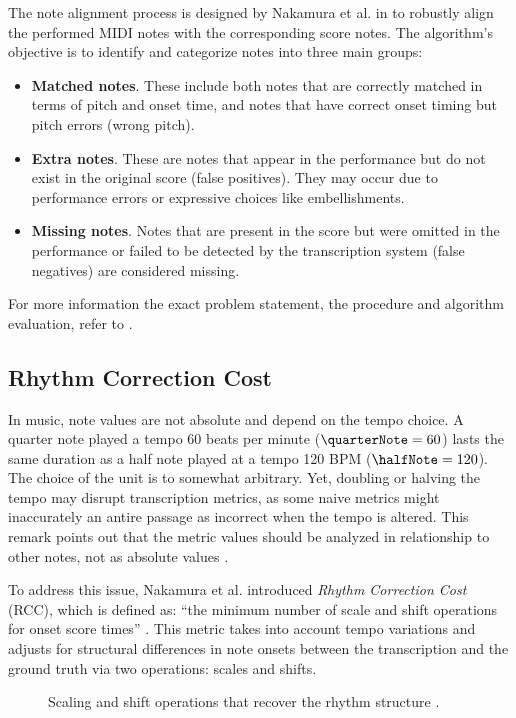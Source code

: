 The note alignment process is designed by Nakamura et al. in \cite{Nakamura2017b} to robustly align the performed MIDI notes with the corresponding score notes. The algorithm's objective is to identify and categorize notes into three main groups: \begin{itemize}
	\item {\bf Matched notes}. These include both notes that are correctly matched in terms of pitch and onset time, and notes that have correct onset timing but pitch errors (wrong pitch).
	\item {\bf Extra notes}. These are notes that appear in the performance but do not exist in the original score (false positives). They may occur due to performance errors or expressive choices like embellishments.
	\item {\bf Missing notes}. Notes that are present in the score but were omitted in the performance or failed to be detected by the transcription system (false negatives) are considered missing.
\end{itemize}

For more information the exact problem statement, the procedure and algorithm evaluation, refer to \cite{Nakamura2017b}.

\subsection{Rhythm Correction Cost}

In music, note values are not absolute and depend on the tempo choice. A quarter note played a tempo $60$ beats per minute ($\quarterNote = 60$) lasts the same duration as a half note played at a tempo 120 BPM ($\halfNote = 120$). The choice of the unit is to somewhat arbitrary. Yet, doubling or halving the tempo may disrupt transcription metrics, as some naive metrics might inaccurately an antire passage as incorrect when the tempo is altered. This remark points out that the metric values should be analyzed in relationship to other notes, not as absolute values \cite{Nakamura2017c}.

To address this issue, Nakamura et al. introduced \emph{Rhythm Correction Cost} (RCC), which is defined as: ``the minimum number of scale and shift operations for onset score times'' \cite{Nakamura2017b}. This metric takes into account tempo variations and adjusts for structural differences in note onsets between the transcription and the ground truth via two operations: scales and shifts.

\begin{figure}[ht!]
\centering

\caption[Scaling and shift operations that recover the rhythm structure.]{Scaling and shift operations that recover the rhythm structure \cite{Nakamura2017b}.}
\label{rhythm_correction}
\end{figure}

